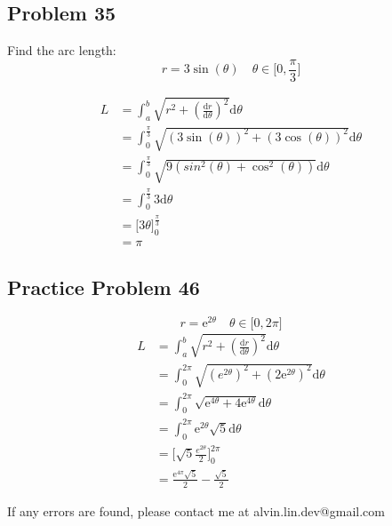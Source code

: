 \documentclass[letterpaper, 12pt]{article}
\newcommand*{\diff}{\mathrm{d}}
\newcommand*{\ddiff}[2]{\frac{\diff{#1}}{\diff{#2}}}
\newcommand*{\e}{\mathrm{e}}
\begin{document}
\subsection*{Problem 35}
Find the arc length:
\[ r = 3\sin(\theta) \quad \theta\in\bigg[0,\frac{\pi}{3}\bigg] \]
\begin{center}
\end{center}
\begin{align*}
  L &= \int_{a}^{b}{\sqrt{r^{2}+(\ddiff{r}{\theta})^{2}}\diff{\theta}} \\
  &= \int_{0}^{\frac{\pi}{3}}
    {\sqrt{(3\sin(\theta))^{2}+(3\cos(\theta))^{2}}\diff{\theta}} \\
  &= \int_{0}^{\frac{\pi}{3}}
    {\sqrt{9(sin^{2}(\theta)+\cos^{2}(\theta))}\diff{\theta}} \\
  &= \int_{0}^{\frac{\pi}{3}}{3\diff{\theta}} \\
  &= \bigg[3\theta\bigg]_{0}^{\frac{\pi}{3}} \\
  &= \pi
\end{align*}

\subsection*{Practice Problem 46}
\[ r = \e^{2\theta} \quad \theta\in\bigg[0,2\pi\bigg] \]
\begin{align*}
  L &= \int_{a}^{b}{\sqrt{r^{2}+(\ddiff{r}{\theta})^{2}}\diff{\theta}} \\
  &= \int_{0}^{2\pi}
    {\sqrt{(e^{2\theta})^{2}+(2\e^{2\theta})^{2}}\diff{\theta}} \\
  &= \int_{0}^{2\pi}{\sqrt{\e^{4\theta}+4\e^{4\theta}}\diff{\theta}} \\
  &= \int_{0}^{2\pi}{\e^{2\theta}\sqrt{5}\diff{\theta}} \\
  &= \bigg[\sqrt{5}\frac{e^{2\theta}}{2}\bigg]_{0}^{2\pi} \\
  &= \frac{\e^{4\pi}\sqrt{5}}{2}-\frac{\sqrt{5}}{2}
\end{align*}

\begin{center}
  If any errors are found, please contact me at alvin.lin.dev@gmail.com
\end{center}
\end{document}
